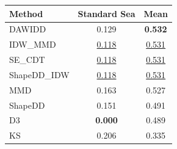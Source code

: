 \begin{tabular}{|l|c|c|}
\hline
\textbf{Method} & \textbf{Standard Sea} & \textbf{Mean} \\
\hline
DAWIDD & 0.129 & \textbf{0.532} \\
IDW\_MMD & \underline{0.118} & \underline{0.531} \\
SE\_CDT & \underline{0.118} & \underline{0.531} \\
ShapeDD\_IDW & \underline{0.118} & \underline{0.531} \\
MMD & 0.163 & 0.527 \\
ShapeDD & 0.151 & 0.491 \\
D3 & \textbf{0.000} & 0.489 \\
KS & 0.206 & 0.335 \\
\hline
\end{tabular}